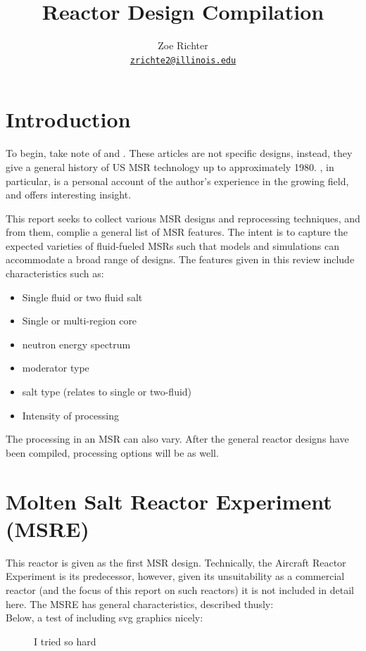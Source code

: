 \documentclass[letterpaper]{article}
\author{Zoe Richter
        \\ \href{mailto:zrichte2@illinois.edu}{\texttt{zrichte2@illinois.edu}}
}
\title{Reactor Design Compilation}
\begin{document}
\begin{titlepage}
\maketitle
\thispagestyle{empty}
\end{titlepage}

\section{Introduction}
To begin, take note of \cite{macpherson_molten_1985} and \cite{rosenthal_molten-salt_1970}.  These articles are not specific designs, instead, they give a general history of US MSR technology up to approximately 1980.  \cite{macpherson_molten_1985}, in particular, is a personal account of the author's experience in the growing field, and offers interesting insight.

This report seeks to collect various MSR designs and reprocessing techniques, and from them, complie a general list of MSR features.  The intent is to capture the expected varieties of fluid-fueled MSRs such that models and simulations can accommodate a broad range of designs.  The features given in this review include characteristics such as:

\begin{itemize}
\item Single fluid or two fluid salt
\item Single or multi-region core
\item neutron energy spectrum
\item moderator type
\item salt type (relates to single or two-fluid)
\item Intensity of processing
\end{itemize}

The processing in an MSR can also vary.  After the general reactor designs have been compiled, processing options will be as well.

\section{Molten Salt Reactor Experiment (MSRE)}
This reactor is given as the first MSR design.  Technically, the Aircraft Reactor Experiment is its predecessor, however, given its unsuitability as a commercial reactor (and the focus of this report on such reactors) it is not included in detail here.  The MSRE has general characteristics, described thusly: \cite{robertson_msre_1965}
\\
Below, a test of including svg graphics nicely:
\begin{figure}
  \centering
  
  \caption{I tried so hard}
  \label{fig:andgotsofar}
  
\end{figure}
\end{document}
